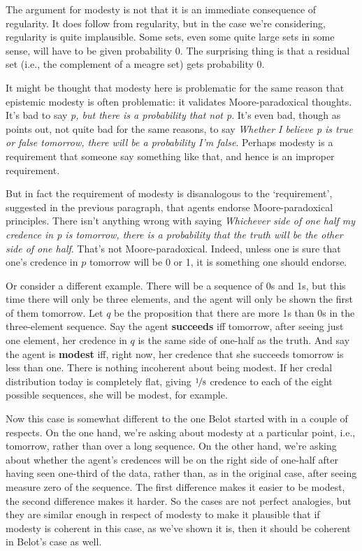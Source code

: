 The argument for modesty is not that it is an immediate consequence of regularity. It does follow from regularity, but in the case we're considering, regularity is quite implausible. Some sets, even some quite large sets in some sense, will have to be given probability 0. The surprising thing is that a residual set (i.e., the complement of a meagre set) gets probability 0. 

It might be thought that modesty here is problematic for the same reason that epistemic modesty is often problematic: it validates Moore-paradoxical thoughts. It's bad to say \textit{p, but there is a probability that not p}. It's even bad, though as \citet{Briggs2009} points out, not quite bad for the same reasons, to say \textit{Whether I believe p is true or false tomorrow, there will be a probability I'm false}. Perhaps modesty is a requirement that someone say something like that, and hence is an improper requirement.

But in fact the requirement of modesty is disanalogous to the `requirement', suggested in the previous paragraph, that agents endorse Moore-paradoxical principles. There isn't anything wrong with saying \textit{Whichever side of one half my credence in p is tomorrow, there is a probability that the truth will be the other side of one half}. That's not Moore-paradoxical. Indeed, unless one is sure that one's credence in $p$ tomorrow will be 0 or 1, it is something one should endorse. 

Or consider a different example. There will be a sequence of 0s and 1s, but this time there will only be three elements, and the agent will only be shown the first of them tomorrow. Let $q$ be the proposition that there are more 1s than 0s in the three-element sequence. Say the agent \textbf{succeeds} iff tomorrow, after seeing just one element, her credence in $q$ is the same side of one-half as the truth. And say the agent is \textbf{modest} iff, right now, her credence that she succeeds tomorrow is less than one. There is nothing incoherent about being modest. If her credal distribution today is completely flat, giving $\nicefrac{1}{8}$ credence to each of the eight possible sequences, she will be modest, for example. 

Now this case is somewhat different to the one Belot started with in a couple of respects. On the one hand, we're asking about modesty at a particular point, i.e., tomorrow, rather than over a long sequence. On the other hand, we're asking about whether the agent's credences will be on the right side of one-half after having seen one-third of the data, rather than, as in the original case, after seeing measure zero of the sequence. The first difference makes it easier to be modest, the second difference makes it harder. So the cases are not perfect analogies, but they are similar enough in respect of modesty to make it plausible that if modesty is coherent in this case, as we've shown it is, then it should be coherent in Belot's case as well.

